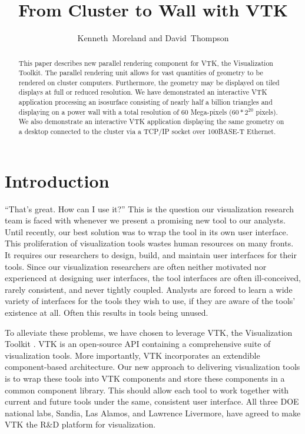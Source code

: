 \documentclass[twocolumn]{article}
\title{From Cluster to Wall with VTK}
\author{Kenneth~Moreland and David~Thompson}
\begin{document}
  \maketitle

  \begin{abstract}
    This paper describes new parallel rendering component for VTK, the
    Visualization Toolkit.  The parallel rendering unit allows for vast
    quantities of geometry to be rendered on cluster computers.
    Furthermore, the geometry may be displayed on tiled displays at full or
    reduced resolution.  We have demonstrated an interactive VTK
    application processing an isosurface consisting of nearly half a
    billion triangles and displaying on a power wall with a total
    resolution of 60 Mega-pixels ($60*2^{20}$ pixels).  We also demonstrate
    an interactive VTK application displaying the same geometry on a
    desktop connected to the cluster via a TCP/IP socket over 100BASE-T
    Ethernet.
  \end{abstract}

  \section{Introduction}
  \label{sec:introduction}

  ``That's great.  How can I use it?''  This is the question our
  visualization research team is faced with whenever we present a promising
  new tool to our analysts.  Until recently, our best solution was to wrap
  the tool in its own user interface.  This proliferation of visualization
  tools wastes human resources on many fronts.  It requires our researchers
  to design, build, and maintain user interfaces for their tools.  Since
  our visualization researchers are often neither motivated nor experienced
  at designing user interfaces, the tool interfaces are often
  ill-conceived, rarely consistent, and never tightly coupled.  Analysts
  are forced to learn a wide variety of interfaces for the tools they wish
  to use, if they are aware of the tools' existence at all.  Often this
  results in tools being unused.

  To alleviate these problems, we have chosen to leverage VTK, the
  Visualization Toolkit \cite{Schroeder98}.  VTK is an open-source API
  containing a comprehensive suite of visualization tools.  More
  importantly, VTK incorporates an extendible component-based architecture.
  Our new approach to delivering visualization tools is to wrap these tools
  into VTK components and store these components in a common component
  library.  This should allow each tool to work together with current and
  future tools under the same, consistent user interface.  All three DOE
  national labs, Sandia, Las Alamos, and Lawrence Livermore, have agreed to
  make VTK the R\&D platform for visualization.
\end{document}
